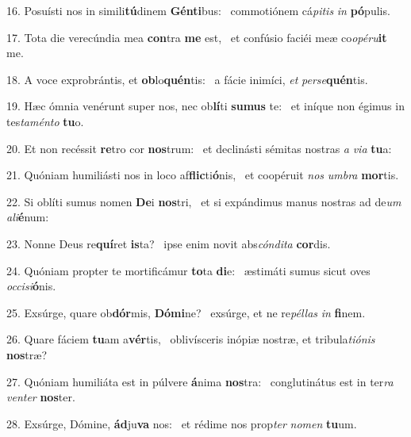 16. Posuísti nos in simili\textbf{tú}dinem \textbf{Gén}\textbf{ti}bus: \ast\  commotiónem cá\textit{pi}\textit{tis} \textit{in} \textbf{pó}pulis.\

17. Tota die verecúndia mea \textbf{con}tra \textbf{me} est, \ast\  et confúsio faciéi meæ co\textit{o}\textit{pé}\textit{ru}\textbf{it} me.\

18. A voce exprobrántis, et \textbf{ob}lo\textbf{quén}tis: \ast\  a fácie inimíci, \textit{et} \textit{per}\textit{se}\textbf{quén}tis.\

19. Hæc ómnia venérunt super nos, nec ob\textbf{lí}ti \textbf{su}\textbf{mus} te: \ast\  et iníque non égimus in tes\textit{ta}\textit{mén}\textit{to} \textbf{tu}o.\

20. Et non recéssit \textbf{re}tro cor \textbf{nos}trum: \ast\  et declinásti sémitas nostras \textit{a} \textit{vi}\textit{a} \textbf{tu}a:\

21. Quóniam humiliásti nos in loco af\textbf{flic}ti\textbf{ó}nis, \ast\  et coopéruit \textit{nos} \textit{um}\textit{bra} \textbf{mor}tis.\

22. Si oblíti sumus nomen \textbf{De}i \textbf{nos}tri, \ast\  et si expándimus manus nostras ad de\textit{um} \textit{a}\textit{li}\textbf{é}num:\

23. Nonne Deus re\textbf{quí}ret \textbf{is}ta? \ast\  ipse enim novit abs\textit{cón}\textit{di}\textit{ta} \textbf{cor}dis.\

24. Quóniam propter te mortificámur \textbf{to}ta \textbf{di}e: \ast\  æstimáti sumus sicut oves \textit{oc}\textit{ci}\textit{si}\textbf{ó}nis.\

25. Exsúrge, quare ob\textbf{dór}mis, \textbf{Dó}\textbf{mi}ne? \ast\  exsúrge, et ne re\textit{pél}\textit{las} \textit{in} \textbf{fi}nem.\

26. Quare fáciem \textbf{tu}am a\textbf{vér}tis, \ast\  oblivísceris inópiæ nostræ, et tribula\textit{ti}\textit{ó}\textit{nis} \textbf{nos}træ?\

27. Quóniam humiliáta est in púlvere \textbf{á}nima \textbf{nos}tra: \ast\  conglutinátus est in ter\textit{ra} \textit{ven}\textit{ter} \textbf{nos}ter.\

28. Exsúrge, Dómine, \textbf{ád}ju\textbf{va} nos: \ast\  et rédime nos prop\textit{ter} \textit{no}\textit{men} \textbf{tu}um.\

